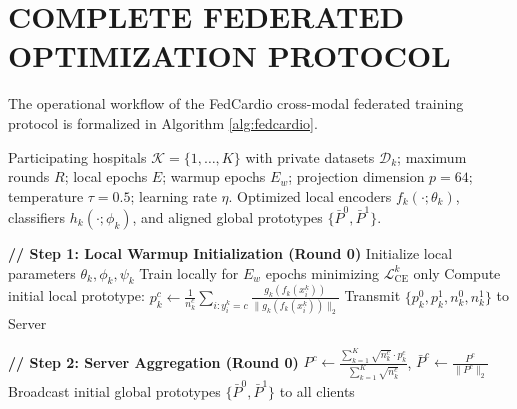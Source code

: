 \documentclass[12pt,a4paper]{amritareport}
\begin{document}
\section{COMPLETE FEDERATED OPTIMIZATION PROTOCOL}

The operational workflow of the FedCardio cross-modal federated training protocol is formalized in Algorithm \ref{alg:fedcardio}.

\begin{algorithm}[htbp]
\caption{CrossFedProto: Cross-Modal Federated Prototype Learning}
\label{alg:fedcardio}
\begin{algorithmic}[1]
\REQUIRE Participating hospitals $\mathcal{K} = \{1, \dots, K\}$ with private datasets $\mathcal{D}_k$; maximum rounds $R$; local epochs $E$; warmup epochs $E_w$; projection dimension $p=64$; temperature $\tau=0.5$; learning rate $\eta$.
\ENSURE Optimized local encoders $f_k(\cdot; \theta_k)$, classifiers $h_k(\cdot; \phi_k)$, and aligned global prototypes $\{\bar{P}^0, \bar{P}^1\}$.

\STATE \textbf{// Step 1: Local Warmup Initialization (Round 0)}
    \STATE Initialize local parameters $\theta_k, \phi_k, \psi_k$
    \STATE Train locally for $E_w$ epochs minimizing $\mathcal{L}_{\text{CE}}^k$ only
        \STATE Compute initial local prototype: $p_k^c \leftarrow \frac{1}{n_k^c} \sum_{i: y_i^k = c} \frac{g_k(f_k(x_i^k))}{\|g_k(f_k(x_i^k))\|_2}$
    \ENDFOR
    \STATE Transmit $\{p_k^0, p_k^1, n_k^0, n_k^1\}$ to Server
\ENDFOR

\STATE \textbf{// Step 2: Server Aggregation (Round 0)}
    \STATE $P^c \leftarrow \frac{\sum_{k=1}^K \sqrt{n_k^c} \cdot p_k^c}{\sum_{k=1}^K \sqrt{n_k^c}}$, \quad $\bar{P}^c \leftarrow \frac{P^c}{\|P^c\|_2}$
\ENDFOR
\STATE Broadcast initial global prototypes $\{\bar{P}^0, \bar{P}^1\}$ to all clients


\end{algorithmic}
\end{algorithm}
\end{document}
